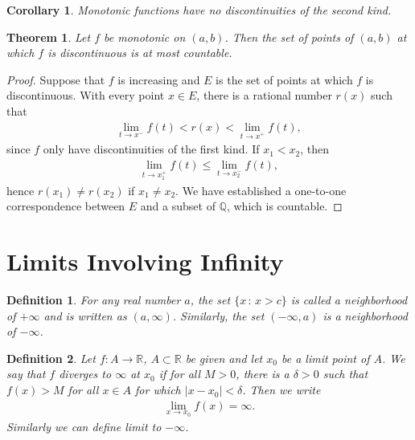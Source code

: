 \documentclass[10pt]{book}
\newtheorem{definition}{Definition}[chapter]
\newtheorem{theorem}{Theorem}[chapter]
\newtheorem{corollary}{Corollary}[theorem]
\theoremstyle{definition}
\numberwithin{equation}{chapter}
\begin{document}
\medskip

\begin{corollary}
Monotonic functions have no discontinuities of the second kind.
\end{corollary}

\medskip

\begin{theorem}
Let $f$ be monotonic on $(a,b)$. Then the set of points of $(a,b)$ at which $f$ is discontinuous is at most countable.
\end{theorem}
\begin{proof}
Suppose that $f$ is increasing and $E$ is the set of points at which $f$ is discontinuous. With every point $x \in E$, there is a rational number $r(x)$ such that 
\begin{align*}
    \lim_{t\to x^-} f(t) < r(x) < \lim_{t\to x^+} f(t),
\end{align*}
since $f$ only have discontinuities of the first kind. If $x_1 < x_2$, then
\begin{align*}
    \lim_{t\to x_1^+} f(t) \leq \lim_{t\to x_2^-} f(t),
\end{align*}
hence $r(x_1) \neq r(x_2)$ if $x_1 \neq x_2$. We have established a one-to-one correspondence between $E$ and a subset of $\mathbb{Q}$, which is countable.
\end{proof}

\medskip

\section{Limits Involving Infinity}

\begin{definition}
For any real number $a$, the set $\{x \,:\, x > c\}$ is called a neighborhood of $+ \infty$ and is written as $(a, \infty)$. Similarly, the set $(- \infty, a)$ is a neighborhood of $- \infty$.
\end{definition}

\medskip

\begin{definition}
Let $f: A \to \mathbb{R}$, $A \subset \mathbb{R}$ be given and let $x_0$ be a limit point of $A$. We say that $f$ diverges to $\infty$ at $x_0$ if for all $M > 0$, there is a $\delta > 0$ such that $f(x) > M$ for all $x \in A$ for which $\left|x - x_0\right| < \delta$. Then we write
\begin{align*}
    \lim_{x \to x_0} f(x) = \infty.
\end{align*}
Similarly we can define limit to $- \infty$.
\end{definition}
\end{document}
